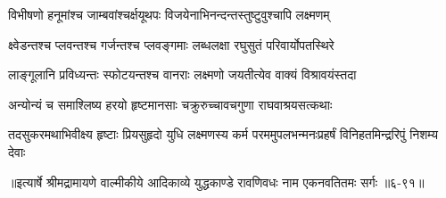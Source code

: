 \twolineshloka
{विभीषणो हनूमांश्च जाम्बवांश्चर्क्षयूथपः}
{विजयेनाभिनन्दन्तस्तुष्टुवुश्चापि लक्ष्मणम्} %

\twolineshloka
{क्ष्वेडन्तश्च प्लवन्तश्च गर्जन्तश्च प्लवङ्गमाः}
{लब्धलक्षा रघुसुतं परिवार्योपतस्थिरे} %

\twolineshloka
{लाङ्गूलानि प्रविध्यन्तः स्फोटयन्तश्च वानराः}
{लक्ष्मणो जयतीत्येव वाक्यं विश्रावयंस्तदा} %

\twolineshloka
{अन्योन्यं च समाश्लिष्य हरयो हृष्टमानसाः}
{चक्रुरुच्चावचगुणा राघवाश्रयसत्कथाः} %

\twolineshloka
{तदसुकरमथाभिवीक्ष्य हृष्टाः प्रियसुहृदो युधि लक्ष्मणस्य कर्म}
{परममुपलभन्मनःप्रहर्षं विनिहतमिन्द्ररिपुं निशम्य देवाः} %


॥इत्यार्षे श्रीमद्रामायणे वाल्मीकीये आदिकाव्ये युद्धकाण्डे रावणिवधः नाम एकनवतितमः सर्गः ॥६-९१॥
